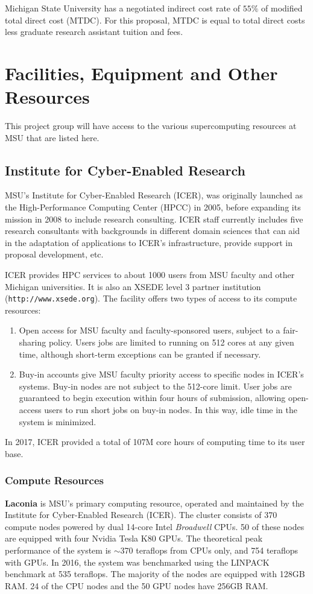 \documentclass[10pt]{article}
\begin{document}
Michigan State University has a negotiated indirect cost rate of $55\%$ of modified total direct cost (MTDC). For this proposal, MTDC is equal to total direct costs less graduate research assistant tuition and fees.





\section{Facilities, Equipment and Other Resources}

This project group will have access to the various supercomputing resources at MSU that are listed here.
\subsection{Institute for Cyber-Enabled Research}

MSU's Institute for Cyber-Enabled Research (ICER), was originally launched as
the High-Performance Computing Center (HPCC) in 2005, before expanding
its mission in 2008 to include research consulting. ICER staff currently
includes five research consultants with backgrounds in different domain
sciences that can aid in the adaptation of applications to ICER's
infrastructure, provide support in proposal development, etc.

ICER provides HPC services to about 1000 users from MSU faculty and other
Michigan universities. It is also an XSEDE level 3 partner institution
(\texttt{http://www.xsede.org}). The facility offers two types of access
to its compute resources:
\begin{enumerate}
\item Open access for MSU faculty and faculty-sponsored users, subject to
a fair-sharing policy. Users jobs are limited to running on 512 cores at
any given time, although short-term exceptions can be granted if necessary.
\item Buy-in accounts give MSU faculty priority access to specific nodes
in ICER's systems. Buy-in nodes are not subject to the 512-core limit.
User jobs are guaranteed to begin execution within four hours of submission,
allowing open-access users to run short jobs on buy-in nodes. In this way,
idle time in the system is minimized.
\end{enumerate}
In 2017, ICER provided a total of 107M core hours of computing time to its
user base.

\subsubsection{Compute Resources}
\textbf{Laconia} is MSU's primary computing resource, operated and maintained
by the Institute for Cyber-Enabled Research (ICER). The cluster consists
of 370 compute nodes powered by dual 14-core Intel \emph{Broadwell} CPUs.
50 of these nodes are equipped with four Nvidia Tesla K80 GPUs. The theoretical
peak performance of the system is  $\sim$370 teraflops from CPUs only, and
754 teraflops with GPUs. In 2016, the system was benchmarked using the LINPACK
benchmark at 535 teraflops. The majority of the nodes are equipped with 128GB
RAM. 24 of the CPU nodes and the 50 GPU nodes have 256GB RAM.
\end{document}
